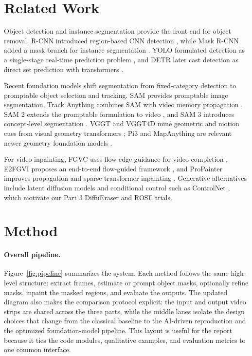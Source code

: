 \documentclass[10pt,twocolumn,letterpaper]{article}
\begin{document}
\section{Related Work}
Object detection and instance segmentation provide the front end for object removal. R-CNN introduced region-based CNN detection \cite{girshick2014rcnn}, while Mask R-CNN added a mask branch for instance segmentation \cite{he2017maskrcnn}. YOLO formulated detection as a single-stage real-time prediction problem \cite{redmon2016yolo}, and DETR later cast detection as direct set prediction with transformers \cite{carion2020detr}.

Recent foundation models shift segmentation from fixed-category detection to promptable object selection and tracking. SAM \cite{kirillov2023sam} provides promptable image segmentation, Track Anything combines SAM with video memory propagation \cite{yang2023trackanything}, SAM 2 extends the promptable formulation to video \cite{ravi2024sam2}, and SAM 3 introduces concept-level segmentation \cite{carion2025sam3}. VGGT and VGGT4D mine geometric and motion cues from visual geometry transformers \cite{wang2025vggt,hu2025vggt4d}; Pi3 and MapAnything are relevant newer geometry foundation models \cite{wang2025pi3,keetha2025mapanything}.

For video inpainting, FGVC uses flow-edge guidance for video completion \cite{gao2020fgvc}, E2FGVI proposes an end-to-end flow-guided framework \cite{li2022e2fgvi}, and ProPainter improves propagation and sparse-transformer inpainting \cite{zhou2023propainter}. Generative alternatives include latent diffusion models \cite{rombach2022ldm} and conditional control such as ControlNet \cite{zhang2023controlnet}, which motivate our Part 3 DiffuEraser and ROSE trials.

\section{Method}
\paragraph{Overall pipeline.}
Figure~\ref{fig:pipeline} summarizes the system. Each method follows the same high-level structure: extract frames, estimate or prompt object masks, optionally refine masks, inpaint the masked regions, and evaluate the outputs. The updated diagram also makes the comparison protocol explicit: the input and output video strips are shared across the three parts, while the middle lanes isolate the design choices that change from the classical baseline to the AI-driven reproduction and the optimized foundation-model pipeline. This layout is useful for the report because it ties the code modules, qualitative examples, and evaluation metrics to one common interface.
\end{document}

